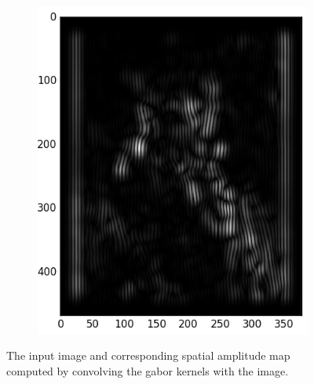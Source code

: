 \documentclass[]{article}
\begin{document}
\begin{figure}
\begin{subfigure}[t]{0.49\textwidth}
      \includegraphics[width=1.\linewidth]{gabor_output.png}
    \end{subfigure}
    \caption{The input image and corresponding spatial amplitude map computed by
    convolving the gabor kernels with the image.}
\end{figure}
\end{document}
